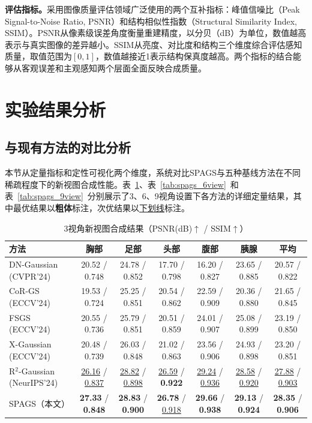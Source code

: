 \textbf{评估指标。}采用图像质量评估领域广泛使用的两个互补指标：峰值信噪比（Peak Signal-to-Noise Ratio, PSNR）\cite{PSNR}和结构相似性指数（Structural Similarity Index, SSIM）\cite{wang2004image}。PSNR从像素级误差角度衡量重建精度，以分贝（dB）为单位，数值越高表示与真实图像的差异越小。SSIM从亮度、对比度和结构三个维度综合评估感知质量，取值范围为$[0, 1]$，数值越接近1表示结构保真度越高。两个指标的结合能够从客观误差和主观感知两个层面全面反映合成质量。

\section{实验结果分析}

\subsection{与现有方法的对比分析}

本节从定量指标和定性可视化两个维度，系统对比SPAGS与五种基线方法在不同稀疏程度下的新视图合成性能。表~\ref{tab:spags_3view}、表~\ref{tab:spags_6view}~和表~\ref{tab:spags_9view}~分别展示了3、6、9视角设置下各方法的详细定量结果，其中最优结果以\textbf{粗体}标注，次优结果以\underline{下划线}标注。

\begin{table}[htbp]
    \centering
    \caption{3视角新视图合成结果（PSNR(dB)$\uparrow$ / SSIM$\uparrow$）}
    \label{tab:spags_3view}
    \footnotesize
    \begin{tabular*}{\textwidth}{@{\extracolsep{\fill}}lcccccc@{}}
        \toprule
        方法 & 胸部 & 足部 & 头部 & 腹部 & 胰腺 & 平均 \\
        \midrule
        DN-Gaussian (CVPR'24) & 20.52 / 0.748 & 24.78 / 0.852 & 17.70 / 0.798 & 16.20 / 0.827 & 23.65 / 0.885 & 20.57 / 0.822 \\
        CoR-GS (ECCV'24) & 19.53 / 0.724 & 25.25 / 0.851 & 20.54 / 0.862 & 22.59 / 0.909 & 20.36 / 0.880 & 21.65 / 0.845 \\
        FSGS (ECCV'24) & 20.55 / 0.736 & 25.79 / 0.851 & 20.51 / 0.859 & 24.01 / 0.907 & 25.08 / 0.899 & 23.19 / 0.850 \\
        X-Gaussian (ECCV'24) & 20.48 / 0.739 & 26.03 / 0.848 & 21.02 / 0.863 & 23.56 / 0.906 & 24.93 / 0.898 & 23.20 / 0.851 \\
        R$^2$-Gaussian (NeurIPS'24) & \underline{26.16} / \underline{0.837} & \underline{28.82} / \underline{0.898} & \underline{26.59} / \textbf{0.922} & \underline{29.24} / \underline{0.936} & \underline{28.58} / \underline{0.920} & \underline{27.88} / \underline{0.903} \\
        SPAGS（本文） & \textbf{27.33} / \textbf{0.848} & \textbf{28.83} / \textbf{0.900} & \textbf{26.78} / \underline{0.918} & \textbf{29.66} / \textbf{0.938} & \textbf{29.13} / \textbf{0.924} & \textbf{28.35} / \textbf{0.906} \\
        \bottomrule
    \end{tabular*}
\end{table}

